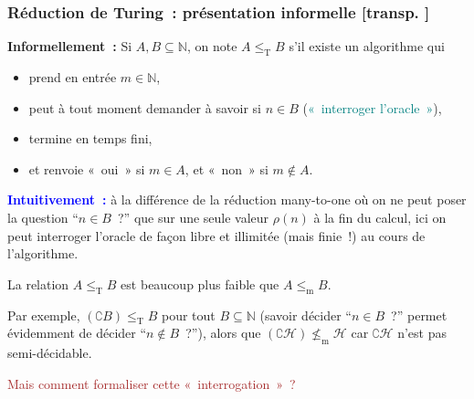 \documentclass[mathserif,a4paper,aspectratio=169]{beamer}
\renewcommand{\frametitle}[1]{\subsubsection*{#1 {\footnotesize[transp. \insertframenumber]}}}
\begin{document}
\begin{frame}
\frametitle{Réduction de Turing : présentation informelle}

\textbf{Informellement :} Si $A,B\subseteq\mathbb{N}$, on note $A
\mathrel{\leq_\mathrm{T}} B$ s'il existe un algorithme qui
\begin{itemize}
\item prend en entrée $m \in \mathbb{N}$,
\item peut à tout moment demander à savoir si $n \in B$
  (\textcolor{teal}{« interroger l'oracle »}),
\item termine en temps fini,
\item et renvoie « oui » si $m \in A$, et « non » si $m \not\in A$.
\end{itemize}

\bigskip

\textcolor{blue}{\textbf{Intuitivement :}} à la différence de la
réduction many-to-one où on ne peut poser la question “$n \in B$ ?”
que sur une seule valeur $\rho(n)$ à la fin du calcul, ici on peut
interroger l'oracle de façon libre et illimitée (mais finie !) au
cours de l'algorithme.

\bigskip

La relation $A \mathrel{\leq_\mathrm{T}} B$ est beaucoup plus faible
que $A \mathrel{\leq_\mathrm{m}} B$.

\smallskip

{\footnotesize Par exemple, $(\complement B) \mathrel{\leq_\mathrm{T}}
  B$ pour tout $B\subseteq\mathbb{N}$ (savoir décider “$n \in B$ ?”
  permet évidemment de décider “$n \not\in B$ ?”), alors que
  $(\complement \mathscr{H}) \mathrel{\not\leq_\mathrm{m}}
  \mathscr{H}$ car $\complement \mathscr{H}$ n'est pas
  semi-décidable.\par}

\bigskip

\textcolor{brown}{Mais comment formaliser cette « interrogation » ?}

\end{frame}
%
\end{document}
